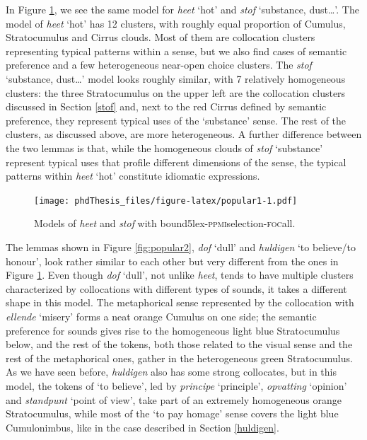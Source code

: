 \documentclass[
]{book}
\begin{document}
In Figure \ref{fig:popular1}, we see the same model for \emph{heet} `hot' and \emph{stof} `substance, dust\ldots{}'. The model of \emph{heet} `hot' has 12 clusters, with roughly equal proportion of Cumulus, Stratocumulus and Cirrus clouds. Most of them are collocation clusters representing typical patterns within a sense, but we also find cases of semantic preference and a few heterogeneous near-open choice clusters. The \emph{stof} `substance, dust\ldots{}' model looks roughly similar, with 7 relatively homogeneous clusters: the three Stratocumulus on the upper left are the collocation clusters discussed in Section \ref{stof} and, next to the red Cirrus defined by semantic preference, they represent typical uses of the `substance' sense. The rest of the clusters, as discussed above, are more heterogeneous. A further difference between the two lemmas is that, while the homogeneous clouds of \emph{stof} `substance' represent typical uses that profile different dimensions of the sense, the typical patterns within \emph{heet} `hot' constitute idiomatic expressions.



\begin{figure}
\centering
\texttt{[image: phdThesis\_files/figure-latex/popular1-1.pdf]}
\caption{\label{fig:popular1}Models of \emph{heet} and \emph{stof} with bound5lex-\textsc{ppmi}selection-\textsc{foc}all.}
\end{figure}

The lemmas shown in Figure \ref{fig:popular2}, \emph{dof} `dull' and \emph{huldigen} `to believe/to honour', look rather similar to each other but very different from the ones in Figure \ref{fig:popular1}. Even though \emph{dof} `dull', not unlike \emph{heet}, tends to have multiple clusters characterized by collocations with different types of sounds, it takes a different shape in this model. The metaphorical sense represented by the collocation with \emph{ellende} `misery' forms a neat orange Cumulus on one side; the semantic preference for sounds gives rise to the homogeneous light blue Stratocumulus below, and the rest of the tokens, both those related to the visual sense and the rest of the metaphorical ones, gather in the heterogeneous green Stratocumulus. As we have seen before, \emph{huldigen} also has some strong collocates, but in this model, the tokens of `to believe', led by \emph{principe} `principle', \emph{opvatting} `opinion' and \emph{standpunt} `point of view', take part of an extremely homogeneous orange Stratocumulus, while most of the `to pay homage' sense covers the light blue Cumulonimbus, like in the case described in Section \ref{huldigen}.
\end{document}
